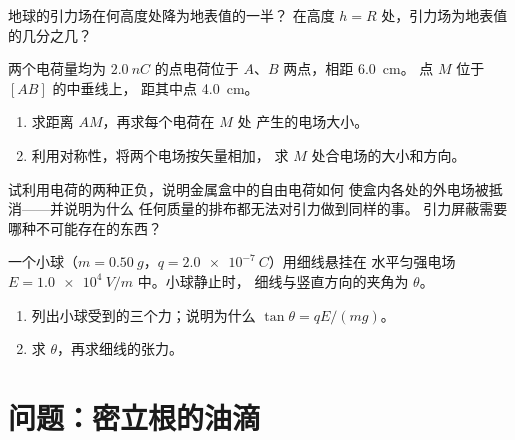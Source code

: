 \begin{exercise}[$\star\star\star$]\label{exo:g11:electric-gravitational-fields:12}
地球的引力场在何高度处降为地表值的一半？
在高度 $h = R$ 处，引力场为地表值的几分之几？
\end{exercise}

\begin{exercise}[$\star\star\star$]\label{exo:g11:electric-gravitational-fields:13}
两个电荷量均为 $\qty{+2.0}{nC}$ 的点电荷位于 $A$、$B$ 两点，相距 \qty{6.0}{cm}。
点 $M$ 位于 $[AB]$ 的中垂线上，
距其中点 \qty{4.0}{cm}。
\begin{enumerate}
  \item 求距离 $AM$，再求每个电荷在 $M$ 处
        产生的电场大小。
  \item 利用对称性，将两个电场按矢量相加，
        求 $M$ 处合电场的大小和方向。
\end{enumerate}
\end{exercise}

\begin{exercise}[$\star\star\star$]\label{exo:g11:electric-gravitational-fields:14}
试利用电荷的两种正负，说明金属盒中的自由电荷如何
使盒内各处的外电场被抵消——并说明为什么
任何质量的排布都无法对引力做到同样的事。
引力屏蔽需要哪种不可能存在的东西？
\end{exercise}

\begin{exercise}[$\star\star\star$]\label{exo:g11:electric-gravitational-fields:15}
一个小球（$m = \qty{0.50}{g}$，$q = \qty{+2.0e-7}{C}$）用细线悬挂在
水平匀强电场 $E = \qty{1.0e4}{V/m}$ 中。小球静止时，
细线与竖直方向的夹角为 $\theta$。
\begin{enumerate}
  \item 列出小球受到的三个力；说明为什么 $\tan\theta = qE / (mg)$。
  \item 求 $\theta$，再求细线的张力。
\end{enumerate}
\end{exercise}

\section{问题：密立根的油滴}

